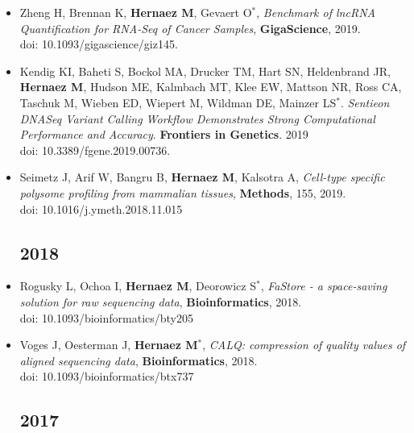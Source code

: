 \documentclass[11pt,a4paper,sans]{moderncv}        %
\begin{document}
\begin{itemize}
\item Zheng H, Brennan K, \textbf{Hernaez M}, Gevaert O$^\ast$, \textsl{Benchmark of lncRNA Quantification for RNA-Seq of Cancer Samples}, \textbf{GigaScience}, 2019.\\
doi: 10.1093/gigascience/giz145. \\

\item Kendig KI, Baheti S, Bockol MA, Drucker TM, Hart SN, Heldenbrand JR, \textbf{Hernaez M}, Hudson ME, Kalmbach MT, Klee EW, Mattson NR, Ross CA, Taschuk M, Wieben ED, Wiepert M, Wildman DE, Mainzer LS$^\ast$. \textsl{Sentieon DNASeq Variant Calling Workflow Demonstrates Strong Computational Performance and Accuracy}. \textbf{Frontiers in Genetics}. 2019\\
doi: 10.3389/fgene.2019.00736.\\

\item Seimetz J, Arif W, Bangru B, \textbf{Hernaez M}, Kalsotra A, \textsl{Cell-type specific polysome profiling from mammalian tissues}, \textbf{Methods}, 155, 2019.\\
doi: 10.1016/j.ymeth.2018.11.015\\


\subsection{2018}
\vspace{6pt}

\item Rogusky L, Ochoa I, \textbf{Hernaez M}, Deorowicz S$^\ast$, \textsl{FaStore - a space-saving solution for raw sequencing data}, \textbf{Bioinformatics}, 2018.\\
doi: 10.1093/bioinformatics/bty205\\

\item Voges J, Oesterman J, \textbf{Hernaez M}$^\ast$, \textsl{CALQ: compression of quality values of aligned sequencing data}, \textbf{Bioinformatics}, 2018.\\
doi: 10.1093/bioinformatics/btx737\\


\subsection{2017}
\vspace{6pt}


\end{itemize}
\end{document}

